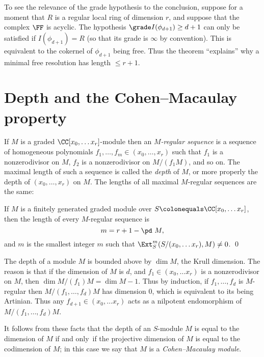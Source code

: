 To see the relevance of the grade hypothesis to the conclusion, suppose
for a moment that $R$ is
a regular local ring of dimension $r$, and suppose that the complex
$\FF$ is acyclic. The hypothesis $\grade I(\phi_{d+1}) \geq d+1$ can
only be satisfied if $I(\phi_{d+1}) = R$ (so that its grade is $\infty$
by convention). This  is equivalent to the cokernel of $\phi_{d+1}$
being free. Thus the theorem ``explains'' why a minimal free resolution
has length $\leq r+1$.

\section{Depth and the Cohen--Macaulay property}

If $M$ is a graded  $\CC[x_0, \dots x_r]$-module then an \emph{$M$-regular
sequence} is a sequence of homogeneous polynomials
$f_1,\dots,f_m \in (x_0,\dots, x_r)$ such that $f_1$ is a nonzerodivisor
on $M$, $f_2$ is a nonzerodivisor on $M/(f_1M)$, and so on.
The maximal length of such a sequence is called the \emph{depth} of $M$,
%
or more properly the depth of $(x_0,\dots, x_r)$ on $M$.
The lengths of
all maximal $M$-regular sequences
%
are
the same:

\begin{theorem}\label{Auslander--Buchsbaum}
If $M$ is a finitely generated graded module
over $S \colonequals  \CC[x_0, \dots x_r]$,
then the length of every $M$-regular sequence is
$$m = r+1 - \pd\  M,$$
and $m$ is the smallest integer $m$ such that
$\Ext_S^m(S/(x_0, \dots x_r), M) \neq 0$.
%
\qed
\end{theorem}

The depth of a module $M$ is bounded above by $\dim M$, the Krull
dimension. The reason is that if the dimension of $M$
is $d$, and $f_1 \in (x_0, \dots x_r) $ is a nonzerodivisor on $M$,
then $\dim M/(f_1)M= \dim M-1$. Thus by induction, if
$f_1,\dots, f_d$ is $M$-regular then $M/(f_1, \dots, f_d)M$ has
dimension 0, which is equivalent to its being Artinian. Thus any
$ f_{d+1} \in(x_0, \dots x_r) $ acts as a nilpotent endomorphism of
$M/(f_1, \dots, f_d)M$.

It follows from these facts that the depth of an $S$-module $M$ is equal
to the dimension of $M$ if and only~if the projective dimension
of $M$ is equal to the codimension of $M$; in this case we say that $M$
is a
%
\emph{Cohen--Macaulay module}.

